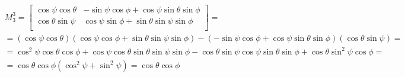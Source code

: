 \documentclass[a4paper, twoside, english]{article}
\begin{document}
{\begin{equation}
	\begin{gathered}
		M^{3}_3 = 
		\left[
		\begin{array}{cc}
			\cos\psi\cos\theta & -\sin\psi\cos\phi+\cos\psi\sin\theta\sin\phi\\
			\cos\theta\sin\psi   & \cos\psi\sin\phi+\sin\theta\sin\psi\sin\phi\\	 	
		\end{array}
		\right]=\\
		= (\cos\psi\cos\theta)(\cos\psi\cos\phi+\sin\theta\sin\psi\sin\phi)-(-\sin\psi\cos\phi+\cos\psi\sin\theta\sin\phi)(\cos\theta\sin\psi)=\\=
		\cos^2\psi\cos\theta\cos\phi+\cos\psi\cos\theta\sin\theta\sin\psi\sin\phi 
		 -\cos\theta\sin\psi\cos\psi\sin\theta\sin\phi+ \cos\theta\sin^2\psi\cos\phi=\\=
		\cos\theta\cos\phi(\cos^2\psi+\sin^2\psi)=\cos\theta\cos\phi
	\end{gathered}
\label{eq:kmatrixM33}
\end{equation}

}
\end{document}

